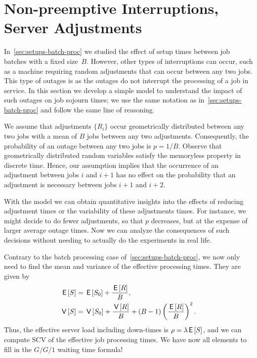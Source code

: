 \section{Non-preemptive Interruptions, Server Adjustments}
\label{sec:non-preempt-interr}





In~\cref{sec:setups-batch-proc} we studied the effect of setup times between job batches with a fixed size~$B$.
However, other types of interruptions can occur, such as a machine requiring random adjustments that can occur between any two jobs.
This type of outages is  as the outages do not interrupt the processing of a job in service.
In this section we develop a simple model to understand the impact of such outages on job sojourn times; we use the same notation as in~\cref{sec:setups-batch-proc} and follow the same line of reasoning.

We assume that adjustments $\{R_i\}$ occur geometrically distributed between any two jobs with a mean of $B$ jobs between any two adjustments.
Consequently, the probability of an outage between any two jobs is $p=1/B$.
Observe that geometrically distributed random variables satisfy the memoryless property in discrete time.
Hence, our assumption implies that the occurrence of an adjustment between jobs $i$ and $i+1$ has no effect on the probability that an adjustment is necessary between jobs $i+1$ and $i+2$.

With the model we can obtain quantitative insights into the effects of reducing adjustment times or the variability of these adjustments times.
For instance, we might decide to do fewer adjustments, so that $p$ decreases, but at the expense of larger average outage times.
Now we can analyze the consequences of such decisions without needing to actually do the experiments in real life. 

Contrary to the batch processing case of~\cref{sec:setups-batch-proc}, we now only need to find the mean and variance of the effective processing times. They are given by
\begin{align}
  \,\mathsf{E}\left[S\right] &= \,\mathsf{E}\left[S_0\right] + \frac{\,\mathsf{E}\left[R\right]}B, \label{eq:88}\\
  \,\mathsf{V}\left[S\right] &= \,\mathsf{V}\left[S_0\right] + \frac{\,\mathsf{V}\left[R\right]} B + (B-1)\left(\frac{\,\mathsf{E}\left[R\right]}{B}\right)^2.\label{eq:89} 
\end{align}
Thus, the effective server load including down-times is $\rho = \lambda \,\mathsf{E}\left[S\right]$, and we can compute SCV of the effective job processing times.
We have now all elements to fill in the $G/G/1$ waiting time formula!




